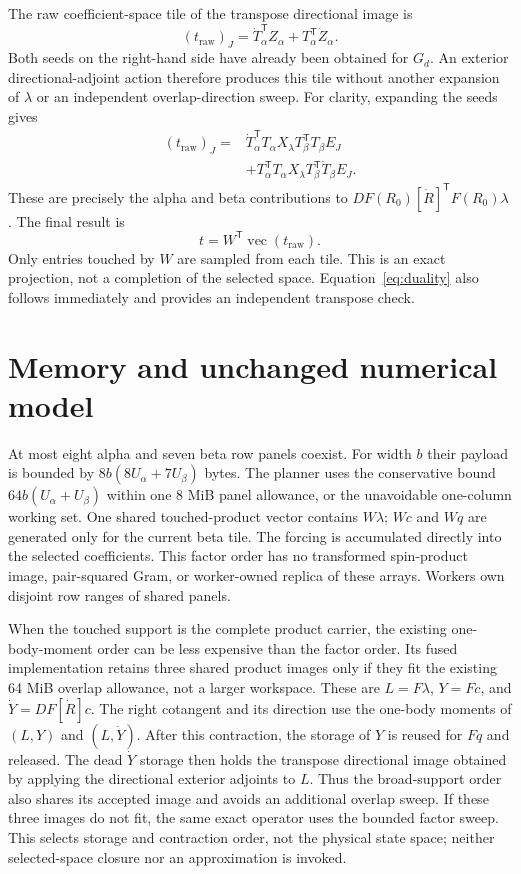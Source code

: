 \documentclass[11pt,a4paper]{article}
\newcommand{\T}{^{\mathsf T}}
\begin{document}
The raw coefficient-space tile of the transpose directional image is
\begin{equation}\label{eq:transpose}
 (t_{\mathrm{raw}})_J=\dot T_\alpha\T Z_\alpha
                         +T_\alpha\T\dot Z_\alpha.
\end{equation}
Both seeds on the right-hand side have already been obtained for $G_d$.
An exterior directional-adjoint action therefore produces this tile without
another expansion of $\lambda$ or an independent overlap-direction sweep.
For clarity, expanding the seeds gives
\begin{align}
 (t_{\mathrm{raw}})_J={}&\dot T_\alpha\T T_\alpha X_\lambda
                                  T_\beta\T T_\beta E_J\\
 &+T_\alpha\T T_\alpha X_\lambda T_\beta\T\dot T_\beta E_J.
\end{align}
These are precisely the alpha and beta contributions to
$DF(R_0)[\dot R]\T F(R_0)\lambda$. The final result is
\begin{equation}
 t=W\T\operatorname{vec}(t_{\mathrm{raw}}).
\end{equation}
Only entries touched by $W$ are sampled from each tile. This is an exact
projection, not a completion of the selected space. Equation~\eqref{eq:duality}
also follows immediately and provides an independent transpose check.

\section{Memory and unchanged numerical model}

At most eight alpha and seven beta row panels coexist. For width $b$ their
payload is bounded by $8b(8U_\alpha+7U_\beta)$ bytes. The planner uses the
conservative bound $64b(U_\alpha+U_\beta)$ within one 8 MiB panel allowance,
or the unavoidable one-column working set. One shared touched-product vector
contains $W\lambda$; $Wc$ and $Wq$ are generated only for the current beta
tile. The forcing is accumulated directly into the selected coefficients.
This factor order has no transformed spin-product image, pair-squared Gram,
or worker-owned replica of these arrays. Workers own disjoint row ranges of
shared panels.

When the touched support is the complete product carrier, the existing
one-body-moment order can be less expensive than the factor order. Its fused
implementation retains three shared product images only if they fit the
existing 64 MiB overlap allowance, not a larger workspace. These are
$L=F\lambda$, $Y=Fc$, and $\dot Y=DF[\dot R]c$. The right cotangent and its
direction use the one-body moments of $(L,Y)$ and $(L,\dot Y)$. After this
contraction, the storage of $Y$ is reused for $Fq$ and released. The dead
$\dot Y$ storage then holds the transpose directional image obtained by
applying the directional exterior adjoints to $L$. Thus the broad-support
order also shares its accepted image and avoids an additional overlap sweep.
If these three images do not fit, the same exact operator uses the bounded
factor sweep. This selects storage and contraction order, not the physical
state space; neither selected-space closure nor an approximation is invoked.
\end{document}
